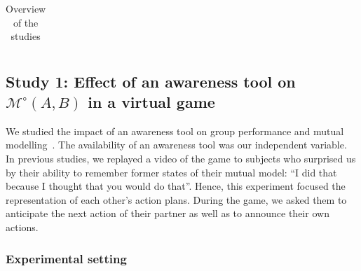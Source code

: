 \documentclass[natbib]{svjour3}
\newcommand{\gModel}[2]{{$\mathcal{M}^{\circ}(#1, #2)$}}
\begin{document}
\begin{table}[ht!]
\begin{tabular}{p{2.1cm}L{1.65cm}L{1.7cm}L{1.8cm}L{1.6cm}L{1.6cm}}
\bottomrule
\end{tabular}
\caption{Overview of the studies}
\label{synthesis_table}
\end{table}



\subsection{{\bf Study 1}: Effect of an awareness tool on \gModel{A}{B} in a virtual
game}

We studied the impact of an awareness tool on group performance and mutual
modelling~\citep{nova2007collaboration}. The availability of an
awareness tool was our independent variable. In previous studies, we replayed a
video of the game to subjects who surprised us by their ability to remember
former states of their mutual model: ``I did that because I thought that you
would do that''. Hence, this experiment focused the representation of each
other's action plans. During the game, we asked them to anticipate the next
action of their partner as well as to announce their own actions.

\subsubsection*{Experimental setting}
\end{document}
